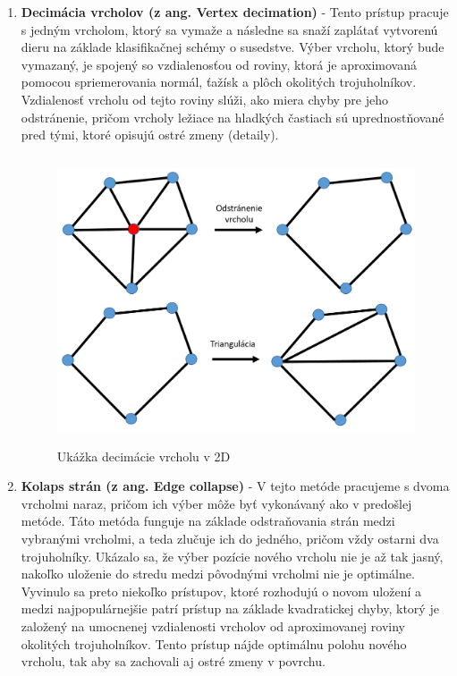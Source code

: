 \begin{enumerate}
    \item\textbf{Decimácia vrcholov (z ang. Vertex decimation)} - Tento prístup pracuje s jedným vrcholom, ktorý sa vymaže a následne sa snaží zaplátať vytvorenú dieru na základe klasifikačnej schémy o susedstve. Výber vrcholu, ktorý bude vymazaný, je spojený so vzdialenosťou od roviny, ktorá je aproximovaná pomocou spriemerovania normál, ťažísk a plôch okolitých trojuholníkov. Vzdialenosť vrcholu od tejto roviny slúži, ako miera chyby pre jeho odstránenie, pričom vrcholy ležiace na hladkých častiach sú uprednostňované pred tými, ktoré opisujú ostré zmeny (detaily). \cite{mesh_simplification}
    \begin{figure}[!htbp]
      \centering
      \includegraphics[width=12cm, height=8.5cm]{img/vertex_decim.png}
      \caption{Ukážka decimácie vrcholu v 2D} 
      \label{fig:vertex_decim}
    \end{figure} 
    \item\textbf{Kolaps strán (z ang. Edge collapse)} - V tejto metóde pracujeme s dvoma vrcholmi naraz, pričom ich výber môže byť vykonávaný ako v predošlej metóde. Táto metóda funguje na základe odstraňovania strán medzi vybranými vrcholmi, a teda zlučuje ich do jedného, pričom vždy ostarni dva trojuholníky. Ukázalo sa, že výber pozície nového vrcholu nie je až tak jasný, nakoľko uloženie do stredu medzi pôvodnými vrcholmi nie je optimálne. Vyvinulo sa preto niekoľko prístupov, ktoré rozhodujú o novom uložení a medzi najpopulárnejšie patrí prístup na základe kvadratickej chyby, ktorý je založený na umocnenej vzdialenosti vrcholov od aproximovanej roviny okolitých trojuholníkov. Tento prístup nájde optimálnu polohu nového vrcholu, tak aby sa zachovali aj ostré zmeny v povrchu.

\end{enumerate}
